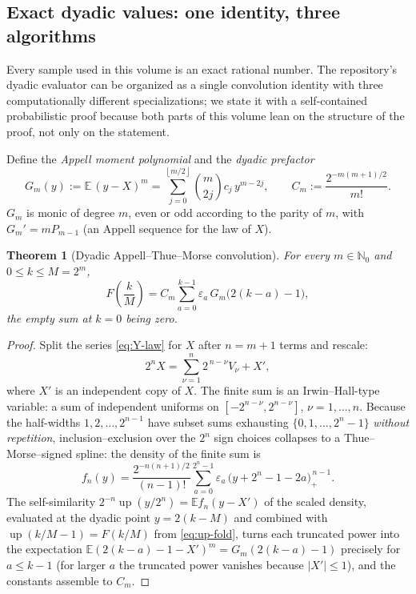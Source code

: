 \documentclass[11pt,oneside]{article}
\numberwithin{equation}{section}
\newtheorem{theorem}{Theorem}[section]
\theoremstyle{definition}
\theoremstyle{remark}
\newcommand{\N}{\mathbb N}
\newcommand{\E}{\mathbb E}
\newcommand{\Up}{\operatorname{up}}
\newcommand{\eps}{\varepsilon}
\newcommand{\abs}[1]{\left\lvert #1\right\rvert}
\newcommand{\floor}[1]{\left\lfloor #1\right\rfloor}
\begin{document}
\subsection{Exact dyadic values: one identity, three algorithms}
\label{sec:dyadic-values}

Every sample used in this volume is an exact rational number.  The
repository's dyadic evaluator can be organized as a single convolution
identity with three computationally different specializations; we state
it with a self-contained probabilistic proof because both parts of this
volume lean on the structure of the proof, not only on the statement.

Define the \emph{Appell moment polynomial} and the \emph{dyadic
prefactor}
\begin{equation}
 G_m(y):=\E\,(y-X)^m
 =\sum_{j=0}^{\floor{m/2}}\binom m{2j}c_j\,y^{m-2j},
 \qquad
 C_m:=\frac{2^{-m(m+1)/2}}{m!}.
 \label{eq:Pm-Cm}
\end{equation}
$G_m$ is monic of degree $m$, even or odd according to the parity of
$m$, with $G_m'=mP_{m-1}$ (an Appell sequence for the law of $X$).

\begin{theorem}[Dyadic Appell--Thue--Morse convolution]
\label{thm:dyadic-values}
For every $m\in\N_0$ and $0\le k\le M=2^m$,
\begin{equation}
 \boxed{\;
 F\!\left(\frac{k}{M}\right)
 =C_m\sum_{a=0}^{k-1}\eps_a\,G_m\bigl(2(k-a)-1\bigr),
 \;}
 \label{eq:dyadic-convolution}
\end{equation}
the empty sum at $k=0$ being zero.
\end{theorem}

\begin{proof}
Split the series \eqref{eq:Y-law} for $X$ after $n=m+1$ terms and
rescale:
\[
 2^{n}X=\sum_{\nu=1}^{n}2^{\,n-\nu}V_\nu+X',
\]
where $X'$ is an independent copy of $X$.  The finite sum is an
Irwin--Hall-type variable: a sum of independent uniforms on
$[-2^{n-\nu},2^{n-\nu}]$, $\nu=1,\dots,n$.  Because the half-widths
$1,2,\dots,2^{n-1}$ have subset sums exhausting
$\{0,1,\dots,2^{n}-1\}$ \emph{without repetition}, inclusion--exclusion
over the $2^n$ sign choices collapses to a Thue--Morse--signed spline:
the density of the finite sum is
\[
 f_n(y)=\frac{2^{-n(n+1)/2}}{(n-1)!}
 \sum_{a=0}^{2^{n}-1}\eps_a\,
 \bigl(y+2^{n}-1-2a\bigr)_+^{\,n-1}.
\]
The self-similarity $2^{-n}\Up(y/2^{n})=\E f_n(y-X')$ of the scaled
density, evaluated at the dyadic point $y=2(k-M)$ and combined with
$\Up(k/M-1)=F(k/M)$ from \eqref{eq:up-fold}, turns each truncated power
into the expectation $\E(2(k-a)-1-X')^{m}=G_m(2(k-a)-1)$ precisely for
$a\le k-1$ (for larger $a$ the truncated power vanishes because
$\abs{X'}\le1$), and the constants assemble to $C_m$.
\end{proof}
\end{document}
